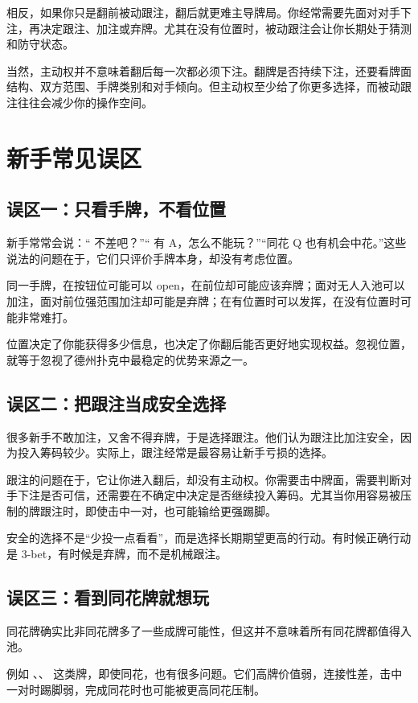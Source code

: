 相反，如果你只是翻前被动跟注，翻后就更难主导牌局。你经常需要先面对对手下注，再决定跟注、加注或弃牌。尤其在没有位置时，被动跟注会让你长期处于猜测和防守状态。

当然，主动权并不意味着翻后每一次都必须下注。翻牌是否持续下注，还要看牌面结构、双方范围、手牌类别和对手倾向。但主动权至少给了你更多选择，而被动跟注往往会减少你的操作空间。

\section{新手常见误区}

\subsection{误区一：只看手牌，不看位置}

新手常常会说：“ 不差吧？”“ 有 A，怎么不能玩？”“同花 Q 也有机会中花。”这些说法的问题在于，它们只评价手牌本身，却没有考虑位置。

同一手牌，在按钮位可能可以 open，在前位却可能应该弃牌；面对无人入池可以加注，面对前位强范围加注却可能是弃牌；在有位置时可以发挥，在没有位置时可能非常难打。

位置决定了你能获得多少信息，也决定了你翻后能否更好地实现权益。忽视位置，就等于忽视了德州扑克中最稳定的优势来源之一。

\subsection{误区二：把跟注当成安全选择}

很多新手不敢加注，又舍不得弃牌，于是选择跟注。他们认为跟注比加注安全，因为投入筹码较少。实际上，跟注经常是最容易让新手亏损的选择。

跟注的问题在于，它让你进入翻后，却没有主动权。你需要击中牌面，需要判断对手下注是否可信，还需要在不确定中决定是否继续投入筹码。尤其当你用容易被压制的牌跟注时，即使击中一对，也可能输给更强踢脚。

安全的选择不是“少投一点看看”，而是选择长期期望更高的行动。有时候正确行动是 3-bet，有时候是弃牌，而不是机械跟注。

\subsection{误区三：看到同花牌就想玩}

同花牌确实比非同花牌多了一些成牌可能性，但这并不意味着所有同花牌都值得入池。

例如 、、 这类牌，即使同花，也有很多问题。它们高牌价值弱，连接性差，击中一对时踢脚弱，完成同花时也可能被更高同花压制。

